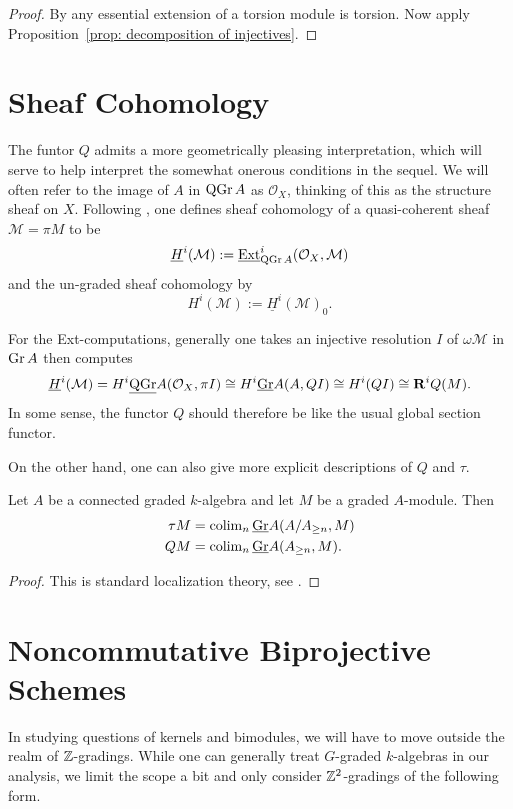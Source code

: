 \begin{proof}
  By \cite[Prop 2.2]{AZ94} any essential extension of a torsion module is torsion.
  Now apply Proposition~\ref{prop: decomposition of injectives}.
\end{proof}

\section{Sheaf Cohomology}

The funtor \(Q\) admits a more geometrically pleasing interpretation, which will serve to help interpret the somewhat onerous conditions in the sequel.
We will often refer to the image of \(A\) in \(\operatorname{QGr}A\) as \(\mathcal{O}_X\), thinking of this as the structure sheaf on \(X\).
Following \cite{AZ94}, one defines sheaf cohomology of a quasi-coherent sheaf \(\mathcal{M} = \pi{M}\) to be
\[\underline{H}^i(\mathcal{M}) := \operatorname{\underline{Ext}}^i_{\operatorname{QGr}A}(\mathcal{O}_X, \mathcal{M})\]
and the un-graded sheaf cohomology by
\[H^i(\mathcal{M}) := \underline{H}^i(\mathcal{M})_0.\]

For the Ext-computations, generally one takes an injective resolution \(I\) of \(\omega\mathcal{M}\) in \(\operatorname{Gr}A\) then computes
\[\underline{H}^i(\mathcal{M}) = H^i\underline{\operatorname{QGr}}A(\mathcal{O}_X, \pi{I}) \cong H^i\underline{\operatorname{Gr}}A(A, QI) \cong H^i(QI) \cong \mathbf{R}^iQ(M).\]
In some sense, the functor \(Q\) should therefore be like the usual global section functor.

On the other hand, one can also give more explicit descriptions of \(Q\) and \(\tau\). 

\begin{proposition}\label{prop: explicit Q and tau}
  Let \(A\) be a connected graded \(k\)-algebra and let \(M\) be a graded \(A\)-module. Then 
  \begin{align*}
    \tau M & = \operatorname{colim}_n \underline{\operatorname{Gr}}A(A/A_{\geq n}, M) \\
    Q M & = \operatorname{colim}_n \underline{\operatorname{Gr}}A(A_{\geq n}, M).
  \end{align*}
\end{proposition}

\begin{proof}
  This is standard localization theory, see \cite{Stenstrom75}.
\end{proof}

\section{Noncommutative Biprojective Schemes}
In studying questions of kernels and bimodules, we will have to move outside the realm of \(\mathbb{Z}\)-gradings. While one can generally treat \(G\)-graded \(k\)-algebras in our analysis, we limit the scope a bit and only consider \(\mathbb{Z}^2\)-gradings of the following form.

